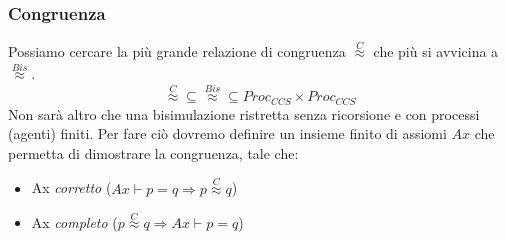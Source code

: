 \subsubsection{Congruenza}
Possiamo cercare la più grande relazione di congruenza $\stackrel{C}{\approx}$
che più si avvicina a $\stackrel{Bis}{\approx}$.
\begin{equation}
    \stackrel{C}{\approx} \subseteq \stackrel{Bis}{\approx} \subseteq Proc_{CCS}
    \times Proc_{CCS}
\end{equation}
Non sarà altro che una bisimulazione ristretta senza ricorsione e con processi
(agenti) finiti. Per fare ciò dovremo definire un insieme finito di assiomi $Ax$
che permetta di dimostrare la congruenza, tale che:
\begin{itemize}
    \item Ax \textit{corretto} ($Ax \vdash p = q \Rightarrow p \stackrel{C}{\approx} q$)
    \item Ax \textit{completo} ($p \stackrel{C}{\approx} q \Rightarrow Ax \vdash p = q$)
\end{itemize}
